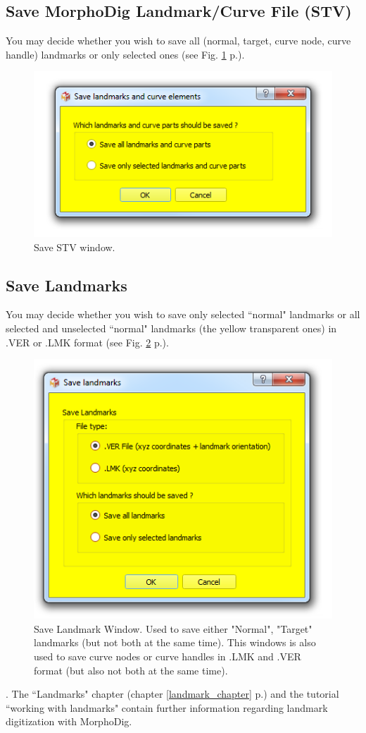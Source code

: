 \subsection{Save MorphoDig Landmark/Curve File (STV)}
You may decide whether you wish to save all (normal, target, curve node, curve handle) landmarks or only selected ones (see Fig. \ref{save_stv} p.\pageref{save_stv}).
\begin{figure}
  \centering
  \includegraphics[scale=0.5]{images/07/landmarks/save_stv.png}
 \caption{Save STV window.}
\label{save_stv}
\end{figure}

\subsection{Save Landmarks}
You may decide whether you wish to save only selected ``normal" landmarks or all selected and
unselected ``normal" landmarks (the yellow transparent ones) in .VER or .LMK format (see Fig. \ref{save_ver_lmk} p.\pageref{save_ver_lmk}).
\begin{figure}
  \centering
  \includegraphics[scale=0.5]{images/07/landmarks/save_ver_lmk.png}
 \caption{Save Landmark Window. Used to save either "Normal", "Target" landmarks (but not both at the same time). This windows is also used to save curve nodes or curve handles in .LMK and .VER format (but also not both at the same time). }
\label{save_ver_lmk}
\end{figure}.
The ``Landmarks" chapter (chapter \ref{landmark_chapter} p.\pageref{landmark_chapter}) and the tutorial ``working with landmarks" contain further information regarding landmark digitization with MorphoDig.


